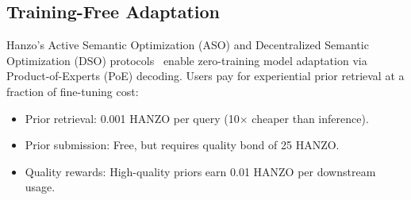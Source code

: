 \subsection{Training-Free Adaptation}

Hanzo's Active Semantic Optimization (ASO) and Decentralized Semantic
Optimization (DSO) protocols~\cite{hanzoaso, hanzodso} enable zero-training model
adaptation via Product-of-Experts (PoE) decoding. Users pay for experiential
prior retrieval at a fraction of fine-tuning cost:

\begin{itemize}[leftmargin=1.1em]
    \item Prior retrieval: 0.001 HANZO per query (10$\times$ cheaper than
    inference).
    \item Prior submission: Free, but requires quality bond of 25 HANZO.
    \item Quality rewards: High-quality priors earn 0.01 HANZO per downstream
    usage.
\end{itemize}

